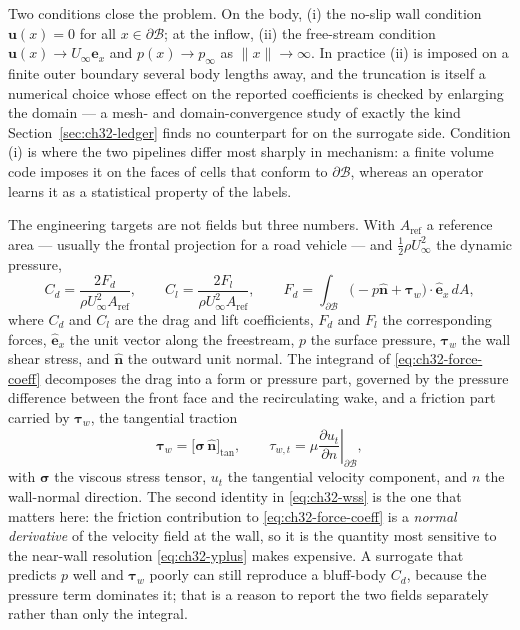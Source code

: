 Two conditions close the problem. On the body, (i) the no-slip wall condition
$\mathbf{u}(x) = 0$ for all $x \in \partial\mathcal{B}$; at the inflow,
(ii) the free-stream condition
$\mathbf{u}(x) \to U_\infty \hat{\mathbf{e}}_x$ and $p(x) \to p_\infty$ as
$\|x\| \to \infty$. In practice (ii) is imposed on a finite outer boundary several body lengths
away, and the truncation is itself a numerical choice whose effect on the reported coefficients
is checked by enlarging the domain --- a mesh- and domain-convergence study of exactly the kind
Section~\ref{sec:ch32-ledger} finds no counterpart for on the surrogate side. Condition (i)
is where the two pipelines differ most sharply in mechanism: a finite volume code imposes it on
the faces of cells that conform to $\partial\mathcal{B}$, whereas an operator learns it as a
statistical property of the labels.

The engineering targets are not fields but three numbers. With $A_{\text{ref}}$ a reference
area --- usually the frontal projection for a road vehicle --- and $\tfrac{1}{2}\rho U_\infty^2$
the dynamic pressure,
\begin{equation}
  \label{eq:ch32-force-coeff}
  C_d = \frac{2 F_d}{\rho U_\infty^2 A_{\text{ref}}}, \qquad C_l = \frac{2 F_l}{\rho U_\infty^2 A_{\text{ref}}}, \qquad F_d = \int_{\partial\mathcal{B}} \big( -p \hat{\mathbf{n}} + \boldsymbol{\tau}_w \big) \cdot \hat{\mathbf{e}}_x \, dA,
\end{equation}
where $C_d$ and $C_l$ are the drag and lift coefficients, $F_d$ and $F_l$ the corresponding
forces, $\hat{\mathbf{e}}_x$ the unit vector along the freestream, $p$ the surface pressure,
$\boldsymbol{\tau}_w$ the wall shear stress, and $\hat{\mathbf{n}}$
the outward unit normal. The integrand of \eqref{eq:ch32-force-coeff} decomposes the drag
into a form or pressure part, governed by the pressure difference between the front face and the
recirculating wake, and a friction part carried by $\boldsymbol{\tau}_w$, the tangential traction
\begin{equation}
  \label{eq:ch32-wss}
  \boldsymbol{\tau}_w = \big[ \boldsymbol{\sigma}\,\hat{\mathbf{n}} \big]_{\text{tan}},
  \qquad \tau_{w,t} = \mu \left. \frac{\partial u_t}{\partial n} \right|_{\partial\mathcal{B}},
\end{equation}
with $\boldsymbol{\sigma}$ the viscous stress tensor, $u_t$ the tangential velocity component,
and $n$ the wall-normal direction. The second identity in \eqref{eq:ch32-wss} is the one that
matters here: the friction contribution to \eqref{eq:ch32-force-coeff} is a \emph{normal
derivative} of the velocity field at the wall, so it is the quantity most sensitive to the
near-wall resolution \eqref{eq:ch32-yplus} makes expensive. 
A surrogate that predicts $p$ well and $\boldsymbol{\tau}_w$ poorly can still reproduce a
bluff-body $C_d$, because the pressure term dominates it; that is a reason to report the two
fields separately rather than only the integral.

